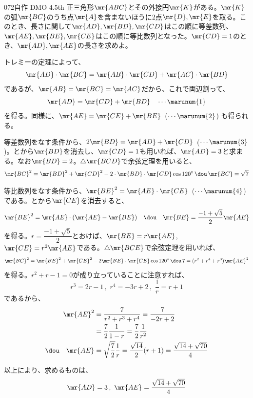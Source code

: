 \begin{prob}{072}{}{自作 DMO 4.5th}
 正三角形$\mr{ABC}$とその外接円$\mr{K}$がある。$\mr{K}$の弧$\mr{BC}$のうち点$\mr{A}$を含まないほうに2点$\mr{D}, \mr{E}$を取る。このとき、長さに関して$\mr{AD}, \mr{BD}, \mr{CD}$はこの順に等差数列、$\mr{AE}, \mr{BE}, \mr{CE}$はこの順に等比数列となった。$\mr{CD}=1$のとき、$\mr{AD}, \mr{AE}$の長さを求めよ。
\end{prob}

トレミーの定理によって、
\[ \mr{AD}\cdot\mr{BC}=\mr{AB}\cdot\mr{CD}+\mr{AC}\cdot\mr{BD} \]
であるが、$\mr{AB}=\mr{BC}=\mr{AC}$だから、これで両辺割って、
\[ \mr{AD}=\mr{CD}+\mr{BD} \quad\cdots \marunum{1} \]
を得る。同様に、$\mr{AE}=\mr{CE}+\mr{BE}$~($\cdots\marunum{2}$) も得られる。

等差数列をなす条件から、$2\mr{BD}=\mr{AD}+\mr{CD}$~($\cdots\marunum{3}$)。とから$\mr{BD}$を消去し、$\mr{CD}=1$も用いれば、$\mr{AD}=3$と求まる。なお$\mr{BD}=2$。$\triangle\mr{BCD}$で余弦定理を用いると、
\[ \mr{BC}^2=\mr{BD}^2+\mr{CD}^2-2\cdot\mr{BD}\cdot\mr{CD}\cos 120^\circ \,\dou\, \mr{BC}=\sqrt{7} \]

等比数列をなす条件から、$\mr{BE}^2=\mr{AE}\cdot\mr{CE}$~($\cdots\marunum{4}$) である。とから$\mr{CE}$を消去すると、
\[ \mr{BE}^2=\mr{AE}\cdot(\mr{AE}-\mr{BE}) \quad\dou\quad \mr{BE}=\frac{-1+\sqrt{5}}{2} \mr{AE} \]
を得る。$r=\dfrac{-1+\sqrt{5}}{2}$とおけば、$\mr{BE}=r\mr{AE}$, $\mr{CE}=r^2\mr{AE}$である。$\triangle\mr{BCE}$で余弦定理を用いれば、
\[ \mr{BC}^2=\mr{BE}^2+\mr{CE}^2-2\mr{BE}\cdot\mr{CE}\cos 120^\circ \,\dou\, 7=(r^2+r^4+r^3)\mr{AE}^2 \]
を得る。$r^2+r-1=0$が成り立っていることに注意すれば、
\[ r^3=2r-1 \,,\,\, r^4=-3r+2 \,,\,\, \frac{1}{r}=r+1 \]
であるから、
\begin{align*}
 \mr{AE}^2&=\frac{7}{r^2+r^3+r^4}=\frac{7}{-2r+2} \\
 &= \frac{7}{2}\frac{1}{1-r}=\frac{7}{2}\frac{1}{r^2} \\
 \dou\quad \mr{AE}&=\sqrt{\frac{7}{2}}\frac{1}{r} = \frac{\sqrt{14}}{2}(r+1) = \frac{\sqrt{14}+\sqrt{70}}{4}
\end{align*}

以上により、求めるものは、
\[ \mr{AD}=3 \,,\,\, \mr{AE}=\frac{\sqrt{14}+\sqrt{70}}{4} \] 